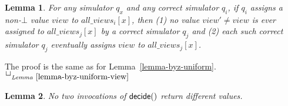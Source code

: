 \documentclass[11pt,letterpaper]{article}
\newtheorem{lemma}{Lemma}
\newlength {\afterproof}
\newcommand{\toto}{xxx}
\newenvironment{proofL}{\noindent{\bf Proof }}
{\hspace*{\fill}$\Box_{\mathit{Lemma}~\ref{\toto}}$\par\vspace{\afterproof}}
\begin{document}
\begin{lemma}
For any simulator $q_x$ and any correct simulator $q_i$, if $q_i$ assigns a
non-$\bot$ value $view$   to $all\_views_i[x]$,
then (1) no value $view'\neq view$ is ever assigned to $all\_views_j[x]$ by
a  correct simulator  $q_j$  and   (2) each  such  correct simulator  $q_j$
eventually assigns $view$ to $all\_views_j[x]$.
\label{lemma-byz-uniform-view}
\end{lemma}

\begin{proofL}
The proof is the same as for Lemma~\ref{lemma-byz-uniform}.
\renewcommand{\toto}{lemma-byz-uniform-view}
\end{proofL}

\begin{lemma}
\label{lemma:safe-byz-agreement}
No two invocations of ${\sf decide}()$ return different values.
\end{lemma}
\end{document}

